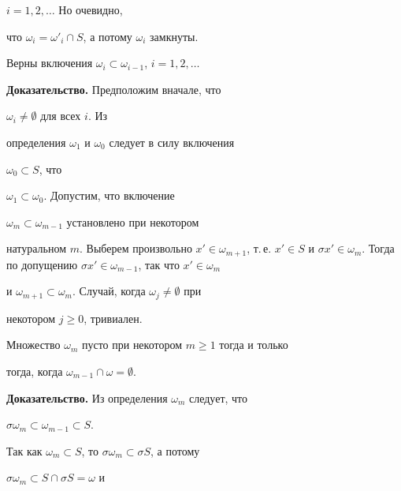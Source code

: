$i=1,2,\dotsc$ Но очевидно, 


что $\omega_i=\omega'_i\cap S$, а потому $\omega_i$ замкнуты. 


 


\begin{pty} 


Верны включения $\omega_i\subset\omega_{i-1}$, $i=1,2,\dotsc$ 


\end{pty} 


 


{\bf Доказательство.} Предположим вначале, что 


$\omega_i\ne\emptyset$ для всех $i$. Из 


определения $\omega_1$ и $\omega_0$ следует в силу включения 


$\omega_0\subset S$, что 


$\omega_1\subset\omega_0$. Допустим, что включение 


$\omega_m\subset\omega_{m-1}$ установлено при некотором 


натуральном $m$. Выберем произвольно $x'\in\omega_{m+1}$, т.\,е. $x'\in 


S$ и $\sigma x'\in\omega_m$. Тогда по допущению $\sigma 


x'\in\omega_{m-1}$, так что $x'\in\omega_m$ 


и $\omega_{m+1}\subset\omega_m$. Случай, когда $\omega_j\ne\emptyset$ при 


некотором $j\ge0$, тривиален. 


 


\begin{pty} 


Множество $\omega_m$ пусто при некотором $m\ge1$ тогда и только 


тогда, когда $\omega_{m-1}\cap\omega=\emptyset$. 


\end{pty} 


 


{\bf Доказательство.} Из определения $\omega_m$ следует, что 


$\sigma\omega_m\subset\omega_{m-1}\subset S$. 


Так как $\omega_m\subset S$, то $\sigma\omega_m\subset\sigma S$, а потому 


$\sigma\omega_m\subset S\cap\sigma S=\omega$ и 


